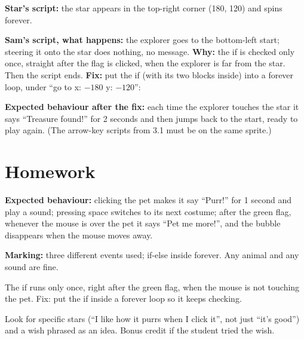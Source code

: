 \begin{answer}
\textbf{Star's script:} the star appears in the top-right corner (180, 120) and spins forever.

\textbf{Sam's script, what happens:} the explorer goes to the bottom-left start; steering it onto the star does nothing, no message.
\textbf{Why:} the if is checked only once, straight after the flag is clicked, when the explorer is far from the star. Then the script ends.
\textbf{Fix:} put the if (with its two blocks inside) into a forever loop, under \enquote{go to x: $-180$ y: $-120$}:
\begin{center}
\begin{scratch}[scale=0.8]
\end{scratch}
\end{center}
\textbf{Expected behaviour after the fix:} each time the explorer touches the star it says \enquote{Treasure found!} for 2 seconds and then jumps back to the start, ready to play again. (The arrow-key scripts from 3.1 must be on the same sprite.)
\end{answer}

\section{Homework}
\begin{answer}
\textbf{Expected behaviour:} clicking the pet makes it say \enquote{Purr!} for 1 second and play a sound; pressing space switches to its next costume; after the green flag, whenever the mouse is over the pet it says \enquote{Pet me more!}, and the bubble disappears when the mouse moves away.

\textbf{Marking:} three different events used; if-else inside forever. Any animal and any sound are fine.
\end{answer}

\begin{answer}
The if runs only once, right after the green flag, when the mouse is not touching the pet. Fix: put the if inside a forever loop so it keeps checking.
\end{answer}

\begin{answer}
Look for specific stars (\enquote{I like how it purrs when I click it}, not just \enquote{it's good}) and a wish phrased as an idea. Bonus credit if the student tried the wish.
\end{answer}
